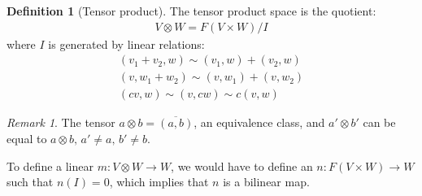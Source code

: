 \documentclass{article}
\theoremstyle{definition}
\newtheorem{Definition}{Definition}
\theoremstyle{remark}
\newtheorem*{Remark*}{Remark}
\theoremstyle{underline}
\theoremstyle{underline}
\begin{document}
\begin{Definition}[Tensor product]
The tensor product space is the quotient:
\begin{gather*}
	V \otimes W = F(V \times W)/I
\end{gather*}
where $I$ is generated by linear relations:
\begin{gather*}
	(v_1 + v_2, w) \sim (v_1, w) + (v_2, w) \\
	(v, w_1 + w_2) \sim (v, w_1) + (v, w_2) \\
	(cv, w) \sim (v, cw) \sim c(v, w)
\end{gather*}
\end{Definition}

\begin{Remark*}
The tensor $a \otimes b = \overline{(a,b)}$, an equivalence class, and $a' \otimes b'$ can be equal to $a \otimes b,\, a' \neq a, \, b' \neq b$.
\end{Remark*}

To define a linear $m\colon V \otimes W \to W$, we would have to define an $n\colon F(V \times W) \to W$ such that $n(I) = 0$, which implies that $n$ is a bilinear map. 
\end{document}
